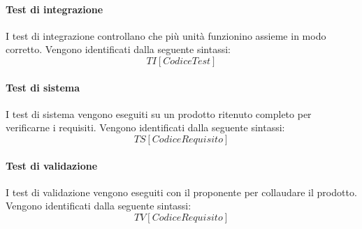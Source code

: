 	\paragraph{Test di integrazione} I test di integrazione controllano che più unità funzionino assieme in modo corretto. Vengono identificati dalla seguente sintassi:
	\[TI[Codice Test]\]

	\paragraph{Test di sistema} I test di sistema vengono eseguiti su un prodotto ritenuto completo per verificarne i requisiti. Vengono identificati dalla seguente sintassi:
	\[TS[Codice Requisito]\]

	\paragraph{Test di validazione} I test di validazione vengono eseguiti con il proponente per collaudare il prodotto. Vengono identificati dalla seguente sintassi:
	\[TV[Codice Requisito]\]

